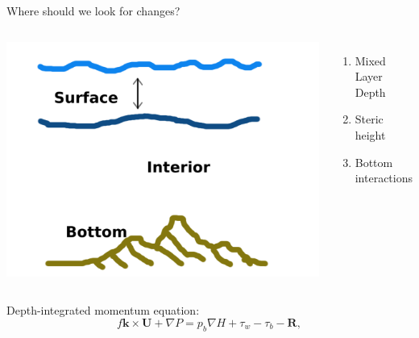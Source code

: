 \documentclass{beamer}
\begin{document}
\begin{frame}{Where should we look for changes?}
\begin{center}
\begin{columns}[c]
\column{1.7in}
\includegraphics[width=1.5\textwidth]{momSink.png}
\column{1.7in}
\pause
\begin{enumerate}
 \item Mixed Layer Depth
 \item Steric height
 \item Bottom interactions
\end{enumerate}

\end{columns}
\end{center}
\begin{alertblock}{Depth-integrated momentum equation:}
 $$f \mathrm{\textbf{k}} \times \mathrm{\textbf{U}} + \nabla P  = p_{b}\nabla H + \tau_{w} - \tau_{b} - \mathrm{\textbf{R}},$$
\end{alertblock}
\end{frame}
\end{document}
